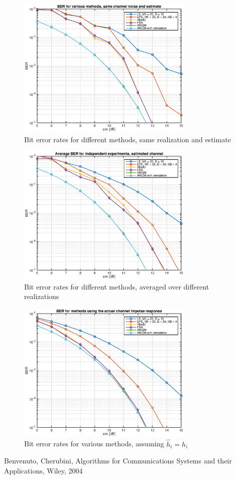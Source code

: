 \documentclass[10pt]{article}
\begin{document}
\begin{figure}[h!]
	\centering
	\includegraphics[width=0.75\textwidth]{BER_same_channel}
	\caption{Bit error rates for different methods, same realization and estimate}
	\label{fig:BER_same}
\end{figure}
\begin{figure}[h!]
	\centering
	\includegraphics[width=0.75\textwidth]{BER_average}
	\caption{Bit error rates for different methods, averaged over different realizations}
	\label{fig:BER_avg}
\end{figure}
\begin{figure}[H]
	\centering
	\includegraphics[width=0.75\textwidth]{BER_real_channel}
	\caption{Bit error rates for various methods, assuming $\hat{h}_i = h_i$}
	\label{fig:BER_real}
\end{figure}

\clearpage

\begin{thebibliography}{10}

Benvenuto, Cherubini, Algorithms for Communications Systems and their Applications, Wiley, 2004

\end{thebibliography}
\end{document}
